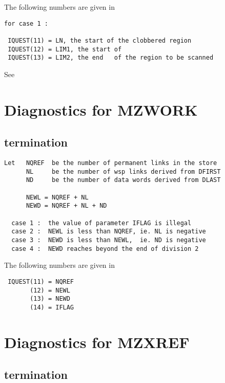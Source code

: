 The following numbers are given in 

\begin{verbatim}
for case 1 :

 IQUEST(11) = LN, the start of the clobbered region
 IQUEST(12) = LIM1, the start of
 IQUEST(13) = LIM2, the end   of the region to be scanned
\end{verbatim}


See 

\section{Diagnostics for MZWORK}


\subsection*{ termination}

\begin{verbatim}
Let   NQREF  be the number of permanent links in the store
      NL     be the number of wsp links derived from DFIRST
      ND     be the number of data words derived from DLAST

      NEWL = NQREF + NL
      NEWD = NQREF + NL + ND

  case 1 :  the value of parameter IFLAG is illegal
  case 2 :  NEWL is less than NQREF, ie. NL is negative
  case 3 :  NEWD is less than NEWL,  ie. ND is negative
  case 4 :  NEWD reaches beyond the end of division 2
\end{verbatim}

The following numbers are given in 

\begin{verbatim}
 IQUEST(11) = NQREF
       (12) = NEWL
       (13) = NEWD
       (14) = IFLAG
\end{verbatim}

\section{Diagnostics for MZXREF}


\subsection*{ termination}


